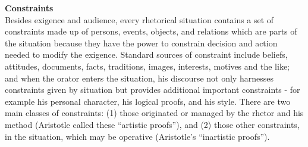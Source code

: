 \documentclass[]{book}
\theoremstyle{definition}
\theoremstyle{definition}
\theoremstyle{definition}
\theoremstyle{remark}
\begin{document}
\textbf{Constraints}\\
Besides exigence and audience, every rhetorical situation contains a set
of constraints made up of persons, events, objects, and relations which
are parts of the situation because they have the power to constrain
decision and action needed to modify the exigence. Standard sources of
constraint include beliefs, attitudes, documents, facts, traditions,
images, interests, motives and the like; and when the orator enters the
situation, his discourse not only harnesses constraints given by
situation but provides additional important constraints - for example
his personal character, his logical proofs, and his style. There are two
main classes of constraints: (1) those originated or managed by the
rhetor and his method (Aristotle called these ``artistic proofs''), and
(2) those other constraints, in the situation, which may be operative
(Aristotle's ``inartistic proofs'').


\end{document}
